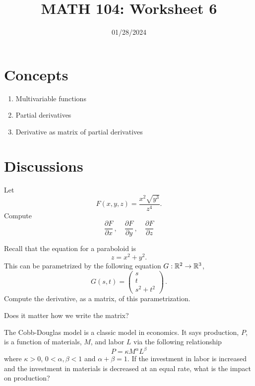 \documentclass[12pt]{amsart}
\title{ MATH 104: Worksheet 6}
\author{}
\date{01/28/2024}
\begin{document}
\maketitle

\section{Concepts}

\begin{enumerate}
    \item Multivariable functions
    \item Partial derivatives
    \item Derivative as matrix of partial derivatives
\end{enumerate}

\section{Discussions}

\begin{question}
    Let 
$$ F(x,y,z) = \frac{x^2\sqrt{y^3}}{z^4}.$$
Compute
$$ \frac{\partial F}{\partial x}\,, \quad \frac{\partial F}{\partial y} \,, \quad \frac{\partial F}{\partial z}$$
\end{question}

\begin{question}
    Recall that the equation for a paraboloid is
    $$ z = x^2 + y^2. $$
    This can be parametrized by the following equation $G: \mathbb{R}^2 \to \mathbb{R}^3$,
    $$ G(s,t) = \begin{pmatrix}
        s \\ t \\ s^2 + t^2 
    \end{pmatrix} \,.$$
    Compute the derivative, as a matrix, of this parametrization.

    Does it matter how we write the matrix?
\end{question}

\begin{question}
    The Cobb-Douglas model is a classic model in economics.
    It says production, $P$, is a function of materials, $M$, and labor $L$ 
    via the following relationship
    \begin{equation*}
        P = \kappa M^\alpha L^\beta
    \end{equation*}
    where $\kappa >0$, $0<\alpha, \beta <1$ and $\alpha + \beta = 1$.
    If the investment in labor is increased and the investment in materials
    is decreased at an equal rate, what is the impact on production?
\end{question}
\end{document}
